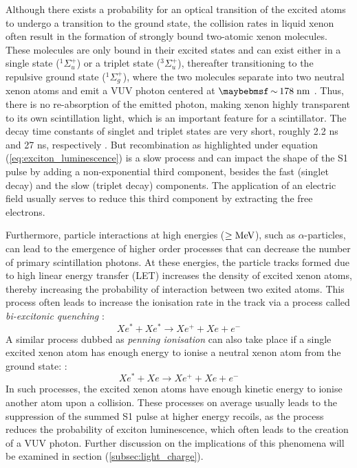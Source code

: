 Although there exists a probability for an optical transition of the excited atoms to undergo a transition to the ground state, the collision rates in liquid xenon often result in the formation of strongly bound two-atomic xenon molecules. These molecules are only bound in their excited states and can exist either in a single state ($^{1}\Sigma^{+}_{u}$) or a triplet state ($^{3}\Sigma^{+}_{u}$), thereafter transitioning to the repulsive ground state ($^{1}\Sigma^{+}_{g}$), where the two molecules separate into two neutral xenon atoms and emit a VUV photon centered at $\sim 178 \; \MathText{nm}$ \cite{FUJII2015293}. Thus, there is no re-absorption of the emitted photon, making xenon highly transparent to its own scintillation light, which is an important feature for a scintillator. The decay time constants of singlet and triplet states are very short, roughly 2.2 ns and 27 ns, respectively \cite{xenon_physics}. But recombination as highlighted under equation (\ref{eq:exciton_luminescence}) is a slow process and can impact the shape of the S1 pulse by adding a non-exponential third component, besides the fast (singlet decay) and the slow (triplet decay) components. The application of an electric field usually serves to reduce this third component by extracting the free electrons.

Furthermore, particle interactions at high energies ($\geq{}\text{MeV}$), such as $\alpha$-particles, can lead to the emergence of higher order processes that can decrease the number of primary scintillation photons. At these energies, the particle tracks formed due to high linear energy transfer (LET) increases the density of excited xenon atoms, thereby increasing the probability of interaction between two exited atoms. This process often leads to increase the ionisation rate in the track via a process called \textit{bi-excitonic quenching} \cite{bi_excitonic}:
%
\begin{equation} \label{eq:bi-excitonic_quenching}
    Xe^{\ast} + Xe^{\ast} \rightarrow Xe^{+} + Xe + e^{-}
\end{equation} 
%
A similar process dubbed as \textit{penning ionisation} can also take place if a single excited xenon atom has enough energy to ionise a neutral xenon atom from the ground state:
\cite{Dahl}:
%
\begin{equation} \label{eq:bi-excitonic_quenching}
    Xe^{\ast} + Xe \rightarrow Xe^{+} + Xe + e^{-}
\end{equation} 
%
In such processes, the excited xenon atoms have enough kinetic energy to ionise another atom upon a collision. These processes on average usually leads to the suppression of the summed S1 pulse at higher energy recoils, as the process reduces the probability of exciton luminescence, which often leads to the creation of a VUV photon. Further discussion on the implications of this phenomena will be examined in section (\ref{subsec:light_charge}).


